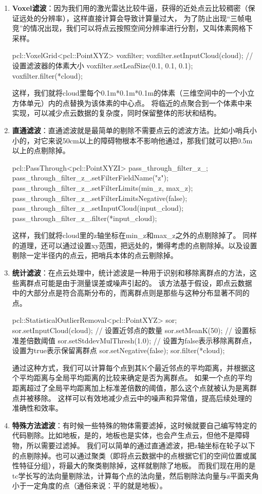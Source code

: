 \begin{enumerate}
\item \textbf{Voxel滤波}：因为我们用的激光雷达比较牛逼，获得的近处点云比较稠密（保证远处的分辨率），这样直接计算会导致计算量过大，
为了防止出现“三帧电竞”的情况出现，我们可以将点云按照空间分辨率进行分割，又叫体素网格下采样。
\begin{tcode}
    pcl::VoxelGrid<pcl::PointXYZ> voxfilter;
    voxfilter.setInputCloud(cloud);
    // 设置滤波器的体素大小
    voxfilter.setLeafSize(0.1, 0.1, 0.1);
    voxfilter.filter(*cloud);
\end{tcode}
这样，我们就将cloud里每个0.1m*0.1m*0.1m的体素（三维空间中的一个小立方体单元）内的点替换为该体素的中心点。
将临近的点聚合到一个体素中来实现，可以减少点云数据的复杂度，同时保留整体的形状和结构。
\item \textbf{直通滤波}：直通滤波就是最简单的剔除不需要点云的滤波方法。比如小哨兵小小的，对它来说50cm以上的障碍物根本不影响他通过，那我们就可以把0.5m以上的点剔除掉。
\begin{tcode}
    pcl::PassThrough<pcl::PointXYZI> pass_through_filter_z_;
    pass_through_filter_z_.setFilterFieldName("z");
    pass_through_filter_z_.setFilterLimits(min_z, max_z);
    pass_through_filter_z_.setFilterLimitsNegative(false);
    pass_through_filter_z_.setInputCloud(input_cloud);
    pass_through_filter_z_.filter(*input_cloud);
\end{tcode}
这样，我们就将cloud里的z轴坐标在min\_z和max\_z之外的点剔除掉了。
同样的道理，还可以通过设置xy范围，把远处的，懒得考虑的点剔除掉。以及设置剔除一定半径内的点云，把哨兵本体的点云剔除掉。
\item \textbf{统计滤波}：在点云处理中，统计滤波是一种用于识别和移除离群点的方法，这些离群点可能是由于测量误差或噪声引起的。
该方法基于假设，即点云数据中的大部分点是符合高斯分布的，而离群点则是那些与这种分布显著不同的点。
\begin{tcode}
    pcl::StatisticalOutlierRemoval<pcl::PointXYZ> sor;
    sor.setInputCloud(cloud);
    // 设置近邻点的数量
    sor.setMeanK(50); 
    // 设置标准差倍数阈值
    sor.setStddevMulThresh(1.0); 
    // 设置为false表示移除离群点，设置为true表示保留离群点
    sor.setNegative(false); 
    sor.filter(*cloud);
\end{tcode}
通过这种方式，我们可以计算每个点到其K个最近邻点的平均距离，并根据这个平均距离与全局平均距离的比较来确定是否为离群点。
如果一个点的平均距离超过了全局平均距离加上标准差倍数的阈值，那么这个点就被认为是离群点并被移除。
这样可以有效地减少点云中的噪声和异常值，提高后续处理的准确性和效率。

\item \textbf{特殊方法滤波}：有时候一些特殊的物体需要滤掉，这时候就要自己编写特定的代码剔除。比如地板，是的，地板也是实体，也会产生点云，但他不是障碍物，所以需要过滤掉。
我们可以简单的通过直通滤波，把z轴坐标在轮子以下的点剔除掉。也可以通过聚类（即将点云数据中的点根据它们的空间位置或属性特征分组），将最大的聚类剔除掉，这样就剔除了地板。
而我们现在用的是tc学长写的法向量剔除法，计算每个点的法向量，然后剔除法向量与z平面夹角小于一定角度的点（通俗来说：平的就是地板）。
\end{enumerate}

